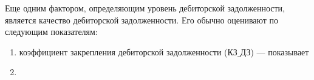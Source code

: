  Еще одним фактором, определяющим уровень дебиторской задолженности, является качество дебиторской задолженности.
 Его обычно оценивают по следующим показателям:
 \begin{enumerate}[azbuk]
 	\item коэффициент закрепления дебиторской задолженности ($\text{КЗ_{ДЗ}}$) --- показывает
 	\item 
 \end{enumerate}
 
 
 
 
 
 
 
 
 
 
 
 
 
 
 
 